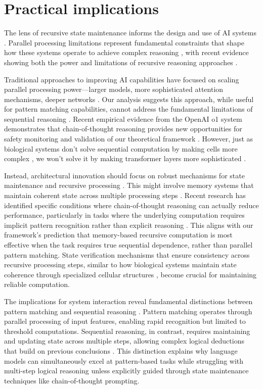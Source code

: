 \documentclass[12pt]{article}
\begin{document}
\section{Practical implications}

The lens of recursive state maintenance informs the design and use of AI systems \cite{dickson2024trust,ahn2024recursive,openai2024o1}.
Parallel processing limitations represent fundamental constraints that shape how these systems operate to achieve complex reasoning \cite{merrill2023parallelism}, with recent evidence showing both the power and limitations of recursive reasoning approaches \cite{liu2024mind}.

Traditional approaches to improving AI capabilities have focused on scaling parallel processing power---larger models, more sophisticated attention mechanisms, deeper networks \cite{shallue2019measuring}.
Our analysis suggests this approach, while useful for pattern matching capabilities, cannot address the fundamental limitations of sequential reasoning \cite{peng2024limitations}.
Recent empirical evidence from the OpenAI o1 system demonstrates that chain-of-thought reasoning provides new opportunities for safety monitoring and validation of our theoretical framework \cite{openai2024o1}.
However, just as biological systems don't solve sequential computation by making cells more complex \cite{wang2023parallel}, we won't solve it by making transformer layers more sophisticated \cite{zhao2024epha}.

Instead, architectural innovation should focus on robust mechanisms for state maintenance and recursive processing \cite{jung2020new}.
This might involve memory systems that maintain coherent state across multiple processing steps \cite{zhu2024overcoming}.
Recent research has identified specific conditions where chain-of-thought reasoning can actually reduce performance, particularly in tasks where the underlying computation requires implicit pattern recognition rather than explicit reasoning \cite{liu2024mind}.
This aligns with our framework's prediction that memory-based recursive computation is most effective when the task requires true sequential dependence, rather than parallel pattern matching.
State verification mechanisms that ensure consistency across recursive processing steps, similar to how biological systems maintain state coherence through specialized cellular structures \cite{espinosa2024molecular}, become crucial for maintaining reliable computation.

The implications for system interaction reveal fundamental distinctions between pattern matching and sequential reasoning \cite{wei2022chain}.
Pattern matching operates through parallel processing of input features, enabling rapid recognition but limited to threshold computations.
Sequential reasoning, in contrast, requires maintaining and updating state across multiple steps, allowing complex logical deductions that build on previous conclusions \cite{dickson2024trust}.
This distinction explains why language models can simultaneously excel at pattern-based tasks while struggling with multi-step logical reasoning unless explicitly guided through state maintenance techniques like chain-of-thought prompting.
\end{document}

